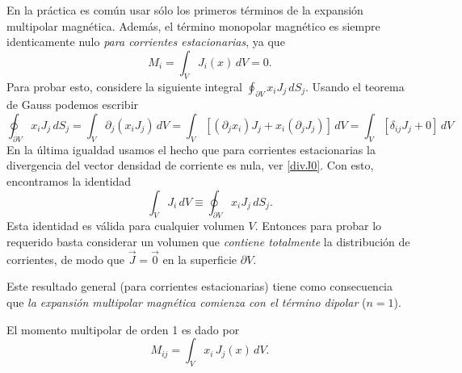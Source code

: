 En la práctica es común usar sólo los primeros términos de la expansión
multipolar magnética. Además, el término monopolar magnético es siempre
identicamente nulo \textit{para corrientes estacionarias}, ya que
\begin{equation}
 M_i=\int_V J_i(x)\,dV=0. \label{mmm0}
\end{equation}
Para probar esto, considere la siguiente integral $\oint_{\partial V}x_i
J_j\,dS_j$. Usando el teorema de Gauss podemos escribir
\begin{equation}
 \oint_{\partial V}x_i
J_j\,dS_j=\int_V\partial_j(x_iJ_j)\,dV=\int_V\left[
(\partial_jx_i)J_j+x_i(\partial_jJ_j)\right]\,dV=\int_V\left[
\delta_{ij}J_j+0\right]\,dV
\end{equation}
En la última igualdad usamos el hecho que para corrientes estacionarias la
divergencia del vector densidad de corriente es nula, ver \eqref{divJ0}. Con esto, encontramos la
identidad
\begin{equation}
  \int_VJ_i\,dV\equiv \oint_{\partial V}x_iJ_j\,dS_j.
\end{equation}
Esta identidad es válida para cualquier volumen $V$. Entonces para probar lo
requerido basta considerar un volumen que \textit{contiene totalmente}
la distribución de corrientes, de modo que $\vec{J}=\vec{0}$ en la superficie
$\partial V$.

Este resultado general (para corrientes estacionarias) tiene como consecuencia
que \textit{la expansión multipolar magnética comienza con el término
dipolar} ($n=1$).

El momento multipolar de orden 1 es dado por
\begin{equation}
 M_{ij}=\int_V x_i\,J_j(x)\,dV.
\end{equation}

